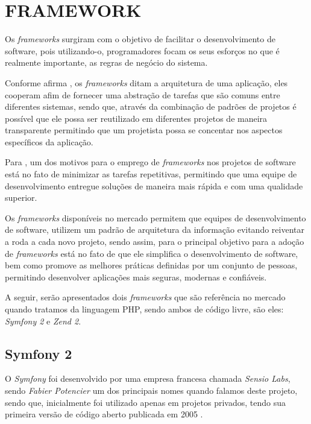 \section{FRAMEWORK}

Os \textit{frameworks} surgiram com o objetivo de facilitar o desenvolvimento de
software, pois utilizando-o, programadores focam os seus esforços no que é
realmente importante, as regras de negócio do sistema.

Conforme afirma , os
\textit{frameworks} ditam a arquitetura de uma aplicação, eles cooperam afim de fornecer 
uma abstração de tarefas que são comuns entre diferentes sistemas, sendo que, 
através da combinação de padrões de projetos é possível que ele possa ser 
reutilizado em diferentes projetos de maneira transparente permitindo que um 
projetista possa se concentar nos aspectos específicos da aplicação.

Para , um dos motivos para o 
emprego de \textit{frameworks} nos projetos de software está no fato de minimizar as 
tarefas repetitivas, permitindo que uma equipe de desenvolvimento entregue 
soluções de maneira mais rápida e com uma qualidade superior.

Os \textit{frameworks} disponíveis no mercado permitem que equipes de
desenvolvimento de software, utilizem um padrão de arquitetura da informação 
evitando reiventar a roda a cada novo projeto, sendo assim, para 
 o principal objetivo para
a adoção de \textit{frameworks} está no fato de que ele simplifica o 
desenvolvimento de software, bem como promove as melhores práticas definidas por
um conjunto de pessoas, permitindo desenvolver aplicações mais seguras, modernas e
confiáveis.

A seguir, serão apresentados dois \textit{frameworks} que são referência no mercado
quando tratamos da linguagem \acs{PHP}, sendo ambos de código livre, são
eles: \textit{Symfony 2} e \textit{Zend 2}.

\subsection{Symfony 2}

O \textit{Symfony} foi desenvolvido por uma empresa francesa chamada
\textit{Sensio Labs}, sendo \textit{Fabier Potencier} um dos principais nomes
quando falamos deste projeto, sendo que, inicialmente foi utilizado apenas em
projetos privados, tendo sua primeira versão de código aberto publicada em 2005 \cite{buildingPHPApplicationsWithSymfonyCakePHPAndZendFramework}.

